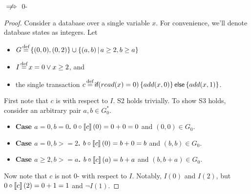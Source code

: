 \begin{claim}
  \istrengthstar $\centernot\implies$ 0-\isafety
\end{claim}
\begin{proof}
  Consider a database over a single variable $x$. For convenience, we'll denote
  database states as integers. Let
  \begin{itemize}
    \item
      $G \defeq \set{(0, 0), (0, 2)} \cup \setst{(a, b)}{a \geq 2, b \geq a}$
    \item
      $I \defeq x = 0 \lor x \geq 2$, and
    \item
      the single \imp{} transaction $c \defeq
      \impif{read(x)=0}{add(x, 0)}{add(x, 1)}$.
  \end{itemize}

  First note that $c$ is \istrengthstar{} with respect to $I$. S2 holds
  trivially. To show S3 holds, consider an arbitrary pair $a, b \in G_0^*$.
  \begin{itemize}
    \item \textbf{Case $a = 0, b = 0$.}
      $0 \circ \left\llbracket c\right\rrbracket(0) = 0 + 0 = 0$ and $(0, 0) \in G_0$.
    \item \textbf{Case $a = 0, b >= 2$.}
      $b \circ \left\llbracket c\right\rrbracket(0) = b + 0 = b$ and $(b, b) \in G_0$.
    \item \textbf{Case $a \geq 2, b >= a$.}
      $b \circ \left\llbracket c\right\rrbracket(a) = b + a$ and $(b, b + a) \in G_0$.
  \end{itemize}

  Now note that $c$ is not 0-\isafe{} with respect to $I$. Notably, $I(0)$ and
  $I(2)$, but $0 \circ \left\llbracket c\right\rrbracket(2) = 0 + 1 = 1$ and $\lnot I(1)$.
\end{proof}

\begin{figure}[h]
  \centering


  \caption{}
  \label{}
\end{figure}

